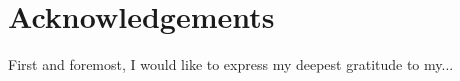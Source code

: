 \chapter*{Acknowledgements}\label{chp:Acknowledgements}

\noindent
{
\hspace{0.635cm}First and foremost, I would like to express my deepest gratitude 
to my...
}